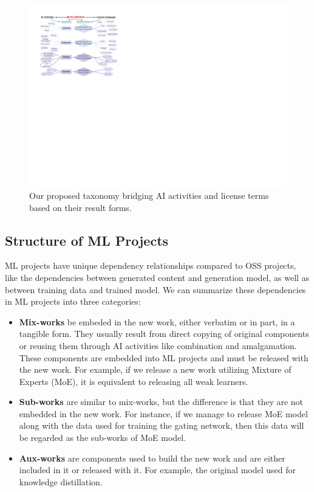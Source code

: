 \begin{figure}[t]
    \centering
    \includegraphics[width=\linewidth]{fig/taxonomy.pdf}
    \caption{Our proposed taxonomy bridging AI activities and license terms based on their result forms.}
    \Description{}
    \label{fig:tax}
    \vspace{-5mm}
\end{figure}


\subsection{Structure of ML Projects}
ML projects have unique dependency relationships compared to OSS projects, like the dependencies between generated content and generation model, as well as between training data and trained model.
We can summarize these dependencies in ML projects into three categories:
\begin{itemize}[leftmargin=*]
    \item \textbf{Mix-works} be embeded in the new work, either verbatim or in part, in a tangible form.
    They usually result from direct copying of original components or reusing them through AI activities like combination and amalgamation. These components are embedded into ML projects and must be released with the new work. 
    For example, if we release a new work utilizing Mixture of Experts (MoE), it is equivalent to releasing all weak learners.

    \item \textbf{Sub-works} are similar to mix-works, but the difference is that they are not embedded in the new work. For instance, if we manage to release MoE model along with the data used for training the gating network, then this data will be regarded as the sub-works of MoE model.
    
    \item \textbf{Aux-works} are components used to build the new work and are either included in it or released with it. For example, the original model used for knowledge distillation.
\end{itemize}

